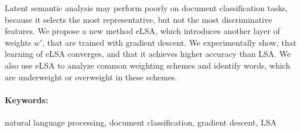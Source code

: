 \documentclass[12pt, oneside]{book}
\theoremstyle{definition}
\begin{document}
Latent semantic analysis may perform poorly on document classification tasks, because it selects the most representative, but not the most discriminative features.
We propose a new method eLSA, which introduces another layer of weights $w'$, that are trained with gradient descent.
We experimentally show, that learning of eLSA converges, and that it achieves higher accuracy than LSA. 
We also use eLSA to analyze common weighting schemes and identify words, which are underweight or overweight in these schemes.

\paragraph*{Keywords:} natural language processing, document classification, gradient descent, LSA




%
%



\newpage 

\tableofcontents




\listoffigures


\listoftables


\mainmatter

 


\newpage	

{
    \backmatter
    
    \thispagestyle{empty}
    \nocite{*}
    \clearpage
    
    
     
}

\appendix


\end{document}
